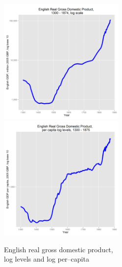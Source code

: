 \documentclass[final]{beamer}
\begin{document}
\begin{frame}
		\begin{figure}[p!]
		\caption{English real gross domestic product, \\
		log levels and log per--capita}
		\label{fig:gdpLog}		
		\centerline{
		\mbox{\includegraphics[width=0.55\textwidth]{gdpLog}}
		\mbox{\includegraphics[width=0.55\textwidth]{gdpPopLog}}
		}
		\end{figure}
\end{frame}
\end{document}
